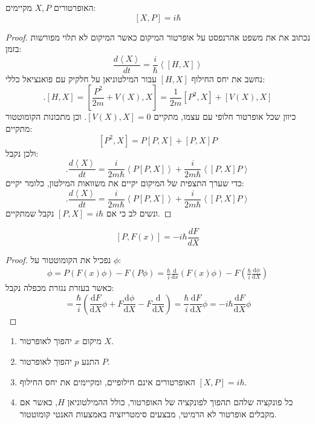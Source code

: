 \documentclass{tstextbook}
\begin{document}
\begin{proposition}
האופרטורים \(X,P\) מקיימים:
$$[X,P]=i\hbar$$

\end{proposition}
\begin{proof}
נכתוב את את משפט אהרנפסט על אופרטור המיקום כאשר המיקום לא תלוי מפורשות בזמן:
$${\frac{d\left\langle X\right\rangle}{d t}}={\frac{i}{\hbar}}\left\langle\left[H,X\right]\right\rangle$$
נחשב את יחס החילוף \([H,X]\) עבור המילטוניאן על חלקיק עם פואנציאל כללי:
$$.\left[H,X\right]=\left[{\frac{P^{2}}{2m}}+V\left(X\right),X\right]={\frac{1}{2m}}\left[P^{2},X\right]+\left[V\left(X\right),X\right]$$
כיוון שכל אופרטור חלופי עם עצמו, מתקיים \([V(X),X]=0\). וכן מתכונות הקומוטטור מתקיים:
$$\left[P^{2},X\right]=P\left[P,X\right]+\left[P,X\right]P$$
ולכן נקבל:
$$.\frac{d\left\langle X\right\rangle}{d t}=\frac{i}{2m\hbar}\left\langle P\left[P,X\right]\right\rangle+\frac{i}{2m\hbar}\left\langle\left[P,X\right]P\right\rangle$$
כדי שערך התצפית של המיקום יקיים את משוואות המילטון, כלומר יקיים:
$$.\frac{d\left\langle X\right\rangle}{d t}=\frac{i}{2m\hbar}\left\langle P\left[P,X\right]\right\rangle+\frac{i}{2m\hbar}\left\langle\left[P,X\right]P\right\rangle$$
ונשים לב כי אם \([P,X]=i\hbar\) נקבל שמתקיים.

\end{proof}
\begin{proposition}
$$[P,F(x)]=-i\hbar{\frac{d F}{d X}}$$

\end{proposition}
\begin{proof}
נפכיל את הקומוטטור על \(\phi\):
\begin{gather*}[P,F(x)]\phi=P\left( F(x)\phi \right)-F\left( P\phi \right)=\frac{\hbar}{i}\frac{\mathrm{d} }{\mathrm{d} x}\left( F(x)\phi \right) -F\left( \frac{\hbar}{i}\frac{\mathrm{d} \phi}{\mathrm{d} X}  \right)  
\end{gather*}
כאשר בעזרת נגזרת מכפלה נקבל:
$$=\frac{\hbar}{i}\left( \frac{\mathrm{d} F}{\mathrm{d} X}\phi +F\frac{\mathrm{d} \phi}{\mathrm{d} X}  -F\frac{\mathrm{d} }{\mathrm{d} X} \right)=\frac{\hbar}{i}\frac{\mathrm{d} F}{\mathrm{d} X}\phi =-i\hbar \frac{\mathrm{d} F}{\mathrm{d} X} \phi$$

\end{proof}
\begin{proposition}[סד"פ קוונטיזציה]
  \begin{enumerate}
    \item מיקום \(x\) יהפוך לאופרטור \(X\). 


    \item התנע \(p\) יהפוך לאופרטור \(P\). 


    \item האופרטורים אינם חילופיים, ומקיימים את יחס החילוף \([X,P]=i\hbar\). 


    \item כל פונקציה שלהם תהפוך לפונקציה של האופרטור, כולל ההמילטוניאן \(H\), כאשר אם מקבלים אופרטור לא הרמיטי, מבצעים סימטריזציה באמצעות האנטי קומוטטור. 


  \end{enumerate}
\end{proposition}
\end{document}
